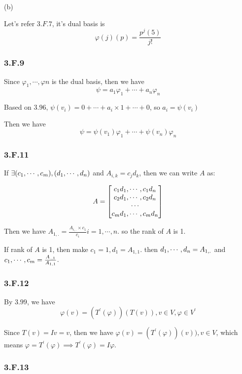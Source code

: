 (b)

Let's refer $3.F.7$, it's dual basis is
\[
\varphi(j)(p) = \frac{p^{j}(5)}{j!}
\]


\subsubsection*{3.F.9}

Since $\varphi_{1},\cdots,\varphi{n}$ is the dual basis, then we have
\[
\psi = a_{1}\varphi_{1} + \cdots + a_{n}\varphi_{n} 
\]

Based on $3.96$, $\psi(v_{i}) = 0 + \cdots + a_{i}\times 1+\cdots+0$, so $a_{i} = \psi(v_{i})$

Then we have
\[
\psi = \psi(v_{1})\varphi_{1} + \cdots + \psi(v_{n})\varphi_{n}
\]

\subsubsection*{3.F.11}

If $\exists (c_{1},\cdots,c_{m}), (d_{1},\cdots,d_{n})$ and $A_{i,k} = c_{j}d_{k}$, then we can write $A$ as:

\[
A = 
\begin{bmatrix}
c_{1}d_{1},\cdots,c_{1}d_{n} \\
c_{2}d_{1},\cdots,c_{2}d_{n} \\
\cdots \\
c_{m}d_{1},\cdots,c_{m}d_{n} 
\end{bmatrix}
\]

Then we have $A_{1,.} = \frac{A_{i,.} \times c_{1}}{c_{i}} i = 1,\cdots,n$. so the rank of $A$ is 1.

If rank of $A$ is 1, then make $c_{1} = 1, d_{1} = A_{1, 1}$. then $d_{1},\cdots,d_{n} = A_{1,.}$ 
and $c_{1},\cdots,c_{m} = \frac{A_{.,1}}{A_{1,1}}$.

\subsubsection*{3.F.12}
By $3.99$, we have 
\[
\varphi(v) = (T^{'}(\varphi))(T(v)) , v\in V, \varphi \in V^{'}
\]

Since $T(v) = Iv = v$, then we have $\varphi(v) = (T^{'}(\varphi))(v)), v\in V$, which means 
$\varphi = T^{'}(\varphi) \implies T^{'}(\varphi) = I\varphi$.

\subsubsection*{3.F.13}


